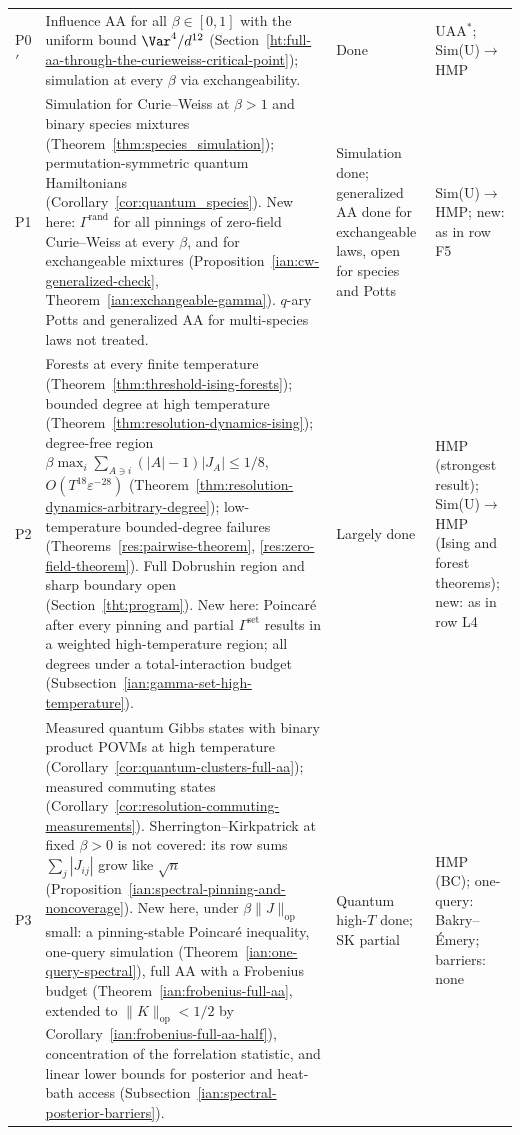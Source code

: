 \begin{longtable}{@{}p{}p{}p{}p{}@{}}
P0\('\) & Influence AA for all \(\beta\in[0,1]\) with the uniform bound \(\Var^4/d^{12}\) (Section~\ref{ht:full-aa-through-the-curieweiss-critical-point}); simulation at every \(\beta\) via exchangeability. & Done & UAA\(^*\); Sim(U)\(\to\)HMP\\
P1 & Simulation for Curie--Weiss at \(\beta>1\) and binary species mixtures (Theorem~\ref{thm:species_simulation}); permutation-symmetric quantum Hamiltonians (Corollary~\ref{cor:quantum_species}). New here: \(\Gamma^{\mathrm{rand}}\) for all pinnings of zero-field Curie--Weiss at every \(\beta\), and for exchangeable mixtures (Proposition~\ref{ian:cw-generalized-check}, Theorem~\ref{ian:exchangeable-gamma}). \(q\)-ary Potts and generalized AA for multi-species laws not treated. & Simulation done; generalized AA done for exchangeable laws, open for species and Potts & Sim(U)\(\to\)HMP; new: as in row F5\\
P2 & Forests at every finite temperature (Theorem~\ref{thm:threshold-ising-forests}); bounded degree at high temperature (Theorem~\ref{thm:resolution-dynamics-ising}); degree-free region \(\beta\max_i\sum_{A\ni i}(|A|-1)|J_A|\le1/8\), \(O(T^{18}\varepsilon^{-28})\) (Theorem~\ref{thm:resolution-dynamics-arbitrary-degree}); low-temperature bounded-degree failures (Theorems~\ref{res:pairwise-theorem}, \ref{res:zero-field-theorem}). Full Dobrushin region and sharp boundary open (Section~\ref{tht:program}). New here: Poincar\'e after every pinning and partial \(\Gamma^{\mathrm{set}}\) results in a weighted high-temperature region; all degrees under a total-interaction budget (Subsection~\ref{ian:gamma-set-high-temperature}). & Largely done & HMP (strongest result); Sim(U)\(\to\)HMP (Ising and forest theorems); new: as in row L4\\
P3 & Measured quantum Gibbs states with binary product POVMs at high temperature (Corollary~\ref{cor:quantum-clusters-full-aa}); measured commuting states (Corollary~\ref{cor:resolution-commuting-measurements}). Sherrington--Kirkpatrick at fixed \(\beta>0\) is not covered: its row sums \(\sum_j|J_{ij}|\) grow like \(\sqrt n\) (Proposition~\ref{ian:spectral-pinning-and-noncoverage}). New here, under \(\beta\|J\|_{\mathrm{op}}\) small: a pinning-stable Poincar\'e inequality, one-query simulation (Theorem~\ref{ian:one-query-spectral}), full AA with a Frobenius budget (Theorem~\ref{ian:frobenius-full-aa}, extended to \(\|K\|_{\mathrm{op}}<1/2\) by Corollary~\ref{ian:frobenius-full-aa-half}), concentration of the forrelation statistic, and linear lower bounds for posterior and heat-bath access (Subsection~\ref{ian:spectral-posterior-barriers}). & Quantum high-\(T\) done; SK partial & HMP (BC); one-query: Bakry--\'Emery; barriers: none\\

\end{longtable}
